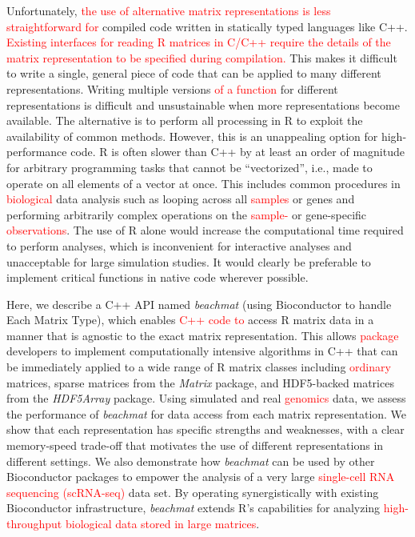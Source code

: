 \documentclass[10pt,letterpaper]{article}
\newcommand{\beachmat}{\textit{beachmat}}
\newcommand{\revised}[1]{\textcolor{red}{#1}}
\begin{document}
Unfortunately, \revised{the use of alternative matrix representations is less straightforward for} compiled code written in statically typed languages like C++.
\revised{Existing interfaces for reading R matrices in C/C++ require the details of the matrix representation to be specified during compilation.}
This makes it difficult to write a single, general piece of code that can be applied to many different representations.
Writing multiple versions \revised{of a function} for different representations is difficult and unsustainable when more representations become available.
The alternative is to perform all processing in R to exploit the availability of common methods.
However, this is an unappealing option for high-performance code.
R is often slower than C++ by at least an order of magnitude for arbitrary programming tasks that cannot be ``vectorized'', i.e., made to operate on all elements of a vector at once.
This includes common procedures in \revised{biological} data analysis such as looping across all \revised{samples} or genes and performing arbitrarily complex operations on the \revised{sample-} or gene-specific \revised{observations}.
The use of R alone would increase the computational time required to perform analyses, which is inconvenient for interactive analyses and unacceptable for large simulation studies.
It would clearly be preferable to implement critical functions in native code wherever possible.


Here, we describe a C++ API named \beachmat{} (using Bioconductor to handle Each Matrix Type), which enables \revised{C++ code to} access R matrix data in a manner that is agnostic to the exact matrix representation.
This allows \revised{package} developers to implement computationally intensive algorithms in C++ that can be immediately applied to a wide range of R matrix classes including \revised{ordinary} matrices, sparse matrices from the \textit{Matrix} package, and HDF5-backed matrices from the \textit{HDF5Array} package.
Using simulated and real \revised{genomics} data, we assess the performance of \beachmat{} for data access from each matrix representation.
We show that each representation has specific strengths and weaknesses, with a clear memory-speed trade-off that motivates the use of different representations in different settings.
We also demonstrate how \beachmat{} can be used by other Bioconductor packages to empower the analysis of a very large \revised{single-cell RNA sequencing (scRNA-seq)} data set. 
By operating synergistically with existing Bioconductor infrastructure, \beachmat{} extends R's capabilities for analyzing \revised{high-throughput biological data stored in large matrices}.
\end{document}
